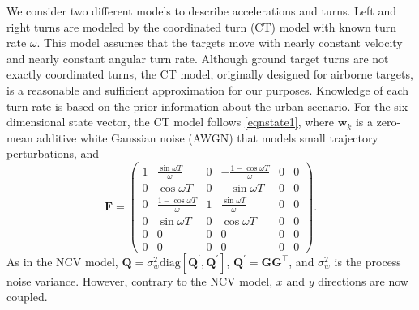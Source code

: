 \documentclass[times]{asjcauth}
\begin{document}
We consider two different models to describe accelerations and turns. Left and right turns are modeled by the coordinated turn (CT) model with known turn rate $\omega$. This model assumes that the targets move with nearly constant velocity and nearly constant angular turn rate. Although ground target turns are not exactly coordinated turns, the CT model, originally designed for airborne targets, is a reasonable and sufficient approximation for our purposes. Knowledge of each turn rate is based on the prior information about the urban scenario.  For the six-dimensional state vector, the CT model follows \eqref{eqnstate1}, where $\mathbf{w}_{k}$ is a zero-mean additive white Gaussian noise (AWGN) that models small trajectory perturbations, and
\begin{equation*}
\mathbf{F} = \left(%
\begin{array}{cccccc}
  1 & \frac{\sin\omega T}{\omega} & 0 & -\frac{1-\cos\omega T}{\omega} & 0 & 0\\
  0 & \cos\omega T & 0 & -\sin\omega T & 0 & 0\\
  0 & \frac{1-\cos\omega T}{\omega} & 1 & \frac{\sin\omega T}{\omega} & 0 & 0\\
  0 & \sin\omega T & 0 & \cos\omega T & 0 & 0\\
  0 & 0 & 0 & 0 & 0 & 0\\
  0 & 0 & 0 & 0 & 0 & 0
\end{array}%
\right).
\end{equation*}
\noindent As in the NCV model, $\mathbf{Q} =
\sigma^{2}_{w}\mathrm{diag}\left[\mathbf{Q}^{\prime},\mathbf{Q}^{\prime}\right]$, $\mathbf{Q}^{\prime} = \mathbf{G}\mathbf{G}^{\top}$, and $\sigma^{2}_{w}$ is the process noise variance. However, contrary to the NCV model, $x$ and $y$ directions are now coupled.
\end{document}
